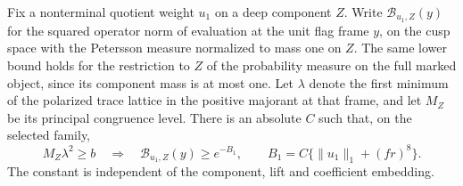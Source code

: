 \begin{auxlemma}
\label{lem:deep-thick-evaluation}
Fix a nonterminal quotient weight \(u_1\) on a deep component \(Z\).
Write \(\mathcal B_{u_1,Z}(y)\) for the squared operator norm of
evaluation at the unit flag frame \(y\), on the cusp space with
the Petersson measure normalized to mass one on \(Z\). The same lower
bound holds for the restriction to \(Z\) of the probability measure
on the full marked object, since its component mass is at most one. Let \(\lambda\) denote the first
minimum of the polarized trace lattice in the positive majorant at
that frame, and let \(M_Z\) be its principal congruence level. There is
an absolute \(C\) such that, on the selected family,
\[
 M_Z\lambda^2\ge b
  \quad\Longrightarrow\quad
 \mathcal B_{u_1,Z}(y)\ge e^{-B_1},\qquad
 B_1=C\{\|u_1\|_1+(fr)^8\}.
\]
The constant is independent of the component, lift and coefficient embedding.
\end{auxlemma}
